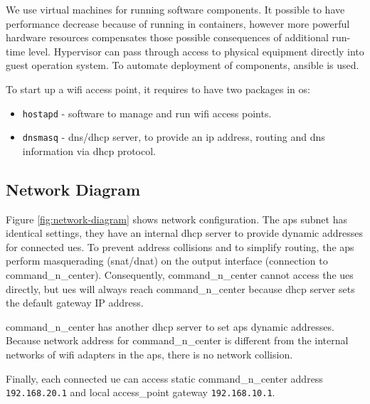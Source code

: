 We use virtual machines for running software components. It possible to 
have performance decrease because of running in containers, however more powerful
hardware resources compensates those possible consequences of additional 
run-time level. Hypervisor can pass through access to physical equipment directly into guest operation system. To automate deployment of components, \gls{ansible} is used.

To start up a \gls{wifi} access point, it requires to have two packages in \acrshort{os}:

\begin{itemize}
\tightlist
\item
  \texttt{hostapd} - software to manage and run \gls{wifi} access points.
\item
  \texttt{dnsmasq} - \acrshort{dns}/\acrshort{dhcp} server, to provide an \acrshort{ip} address, routing
  and \acrshort{dns} information via \acrshort{dhcp} protocol.
\end{itemize}

\subsection{Network Diagram}\label{network-diagram}


Figure \ref{fig:network-diagram} shows network configuration. The \glspl{ap} subnet has identical settings, they have an internal \gls{dhcp} server to provide dynamic addresses for connected \glspl{ue}. To prevent address collisions and to simplify routing, the \glspl{ap} perform masquerading (\acrshort{snat}/\acrshort{dnat}) on the output interface (connection to \gls{command_n_center}). Consequently, \gls{command_n_center} cannot access the \glspl{ue} directly, but \glspl{ue} will always reach \gls{command_n_center} because \acrshort{dhcp} server sets the default gateway IP address.

\gls{command_n_center} has another \acrshort{dhcp} server to set \glspl{ap} dynamic addresses. Because network address for \gls{command_n_center} is different from the internal networks of \gls{wifi} adapters in the \glspl{ap}, there is no network collision.

Finally, each connected \gls{ue} can access static \gls{command_n_center} address \texttt{192.168.20.1}
and local \acrshort{access_point} gateway \texttt{192.168.10.1}.


